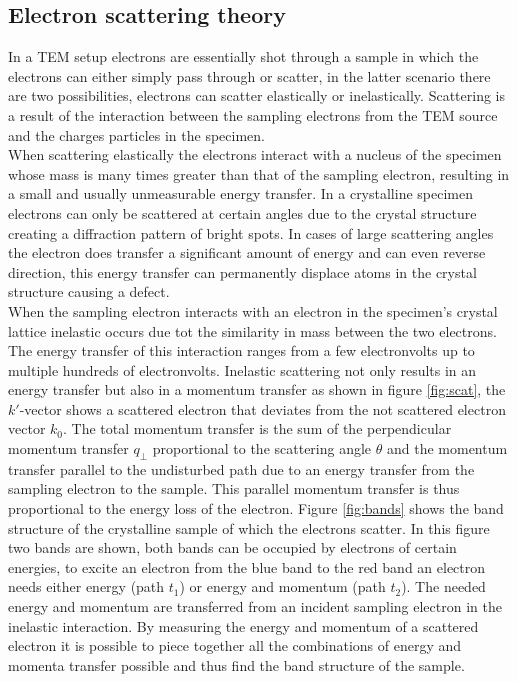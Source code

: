 \subsection{Electron scattering theory}
In a TEM setup electrons are essentially shot through a sample in which the electrons can either simply pass through or scatter, in the latter scenario there are two possibilities, electrons can scatter elastically or inelastically.
Scattering is a result of the interaction between the sampling electrons from the TEM source and the charges particles in the specimen.\\
When scattering elastically the electrons interact with a nucleus of the specimen whose mass is many times greater than that of the sampling electron, resulting in a small and usually unmeasurable energy transfer.
In a crystalline specimen electrons can only be scattered at certain angles due to the crystal structure creating a diffraction pattern of bright spots. In cases of large scattering angles the electron does transfer a significant amount of energy and can even reverse direction, this energy transfer can permanently displace atoms in the crystal structure causing a defect.\\
When the sampling electron interacts with an electron in the specimen's crystal lattice inelastic occurs due tot the similarity in mass between the two electrons. The energy transfer of this interaction ranges from a few electronvolts up to multiple hundreds of electronvolts.
Inelastic scattering not only results in an energy transfer but also in a momentum transfer as shown in figure \ref{fig:scat}, the $k'$-vector shows a scattered electron that deviates from the not scattered electron vector $k_0$.
The total momentum transfer is the sum of the perpendicular momentum transfer $q_{\perp}$ proportional to the scattering angle $\theta$ and the momentum transfer parallel to the undisturbed path due to an energy transfer from the sampling electron to the sample. This parallel momentum transfer is thus proportional to the energy loss of the electron.
Figure \ref{fig:bands} shows the band structure of the crystalline sample of which the electrons scatter. In this figure two bands are shown, both bands can be occupied by electrons of certain energies, to excite an electron from the blue band to the red band an electron needs either energy (path $t_1$) or energy and momentum (path $t_2$).
The needed energy and momentum are transferred from an incident sampling electron in the inelastic interaction. By measuring the energy and momentum of a scattered electron it is possible to piece together all the combinations of energy and momenta transfer possible and thus find the band structure of the sample.\\
